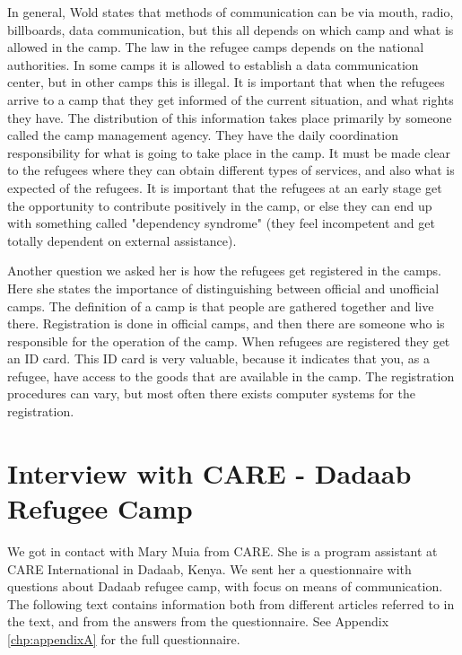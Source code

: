 In general, Wold states that methods of communication can be via mouth, radio, billboards, data communication, but this all depends on which camp and what is allowed in the camp. The law in the refugee camps depends on the national authorities. In some camps it is allowed to establish a data communication center, but in other camps this is illegal. It is important that when the refugees arrive to a camp that they get informed of the current situation, and what rights they have. The distribution of this information takes place primarily by someone called the camp management agency. They have the daily coordination responsibility for what is going to take place in the camp. It must be made clear to the refugees where they can obtain different types of services, and also what is expected of the refugees. It is important that the refugees at an early stage get the opportunity to contribute positively in the camp, or else they can end up with something called "dependency syndrome" (they feel incompetent and get totally dependent on external assistance). 

Another question we asked her is how the refugees get registered in the camps. Here she states the importance of distinguishing between official and unofficial camps. The definition of a camp is that people are gathered together and live there. Registration is done in official camps, and then there are someone who is responsible for the operation of the camp. When refugees are registered they get an ID card. This ID card is very valuable, because it indicates that you, as a refugee, have access to the goods that are available in the camp. The registration procedures can vary, but most often there exists computer systems for the registration.



\section{Interview with CARE - Dadaab Refugee Camp}
\label{sec:interviewcare}
We got in contact with Mary Muia from CARE. She is a program assistant at CARE International in Dadaab, Kenya. We sent her a questionnaire with questions about Dadaab refugee camp, with focus on means of communication. The following text contains information both from different articles referred to in the text, and from the answers from the questionnaire. See Appendix \ref{chp:appendixA} for the full questionnaire. 

